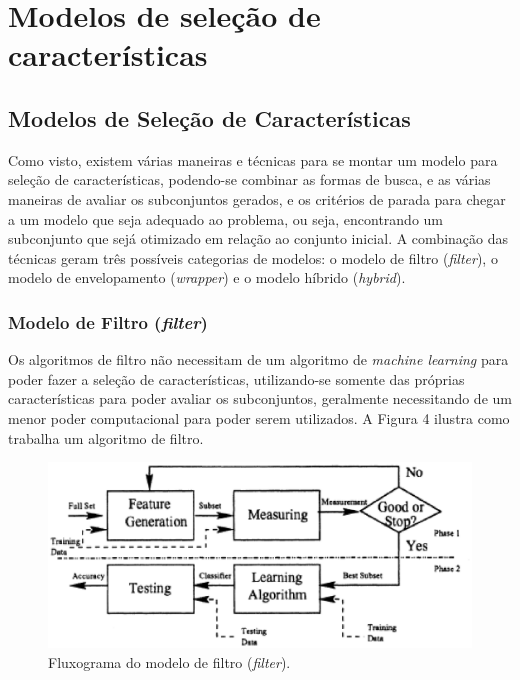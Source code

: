 \chapter[Modelos de seleção de características]{Modelos de seleção de características}

\section{Modelos de Seleção de Características}

Como visto, existem várias maneiras e técnicas para se montar um modelo para seleção de características, podendo-se combinar as formas de busca, e as várias maneiras de avaliar os subconjuntos gerados, e os critérios de parada para chegar a um modelo que seja adequado ao problema, ou seja, encontrando um subconjunto que sejá otimizado em relação ao conjunto inicial. A combinação das técnicas geram três possíveis categorias de modelos: o modelo de filtro (\textit {filter}), o modelo de envelopamento (\textit {wrapper}) e o modelo híbrido (\textit {hybrid}). 

\subsection{Modelo de Filtro (\textit{filter})}

Os algoritmos de filtro não necessitam de um algoritmo de \textit{machine learning} para poder fazer a seleção de características, utilizando-se somente das próprias características para poder avaliar os subconjuntos, geralmente necessitando de um menor poder computacional para poder serem utilizados. A Figura 4 ilustra como trabalha um algoritmo de filtro.

\begin{figure}[h]
	\centering
	\label{fig05}
		\includegraphics[keepaspectratio=true,scale=1]{figuras/fig05.eps}
	\caption{Fluxograma do modelo de filtro (\textit{filter}). \cite{huan_1998}}
\end{figure}


